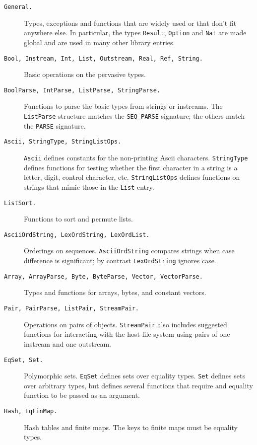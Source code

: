 \begin{description}
  \item[\tt General.]
	Types, exceptions and functions that are widely used or that
	don't fit anywhere else.  In particular, the types {\tt Result},
	{\tt Option} and {\tt Nat} are made global and are used in many
	other library entries.

  \item[\tt Bool, Instream, Int, List, Outstream, Real, Ref, String.]
	Basic operations on the pervasive types.
 
  \item[\tt BoolParse, IntParse, ListParse, StringParse.]
	Functions to parse the basic types from strings or instreams.
	The {\tt ListParse} structure matches the {\tt SEQ\_PARSE}
	signature; the others match the {\tt PARSE} signature.

  \item[\tt Ascii, StringType, StringListOps.]
	{\tt Ascii} defines constants for the non-printing Ascii
	characters.  {\tt StringType} defines functions for testing
	whether the first character in a string is a letter, digit,
	control character, etc.  {\tt StringListOps} defines functions
	on strings that mimic those in the {\tt List} entry.

  \item[\tt ListSort.]
	Functions to sort and permute lists.

  \item[\tt AsciiOrdString, LexOrdString, LexOrdList.]
	Orderings on sequences.  {\tt AsciiOrdString} compares strings
	when case difference is significant; by contrast {\tt LexOrdString}
	ignores case.

  \item[\tt Array, ArrayParse, Byte, ByteParse, Vector, VectorParse.]
	Types and functions for arrays, bytes, and constant vectors.

  \item[\tt Pair, PairParse, ListPair, StreamPair.]
	Operations on pairs of objects.  {\tt StreamPair} also
	includes suggested functions for interacting with the host file
	system using pairs of one instream and one outstream.
 
  \item[\tt EqSet, Set.]
	Polymorphic sets.  {\tt EqSet} defines sets over equality
	types.  {\tt Set} defines sets over arbitrary types, but
	defines several functions that require and equality function
	to be passed as an argument.

  \item[\tt Hash, EqFinMap.]
	Hash tables and finite maps.  The keys to finite maps must
	be equality types.   
  

\end{description}
